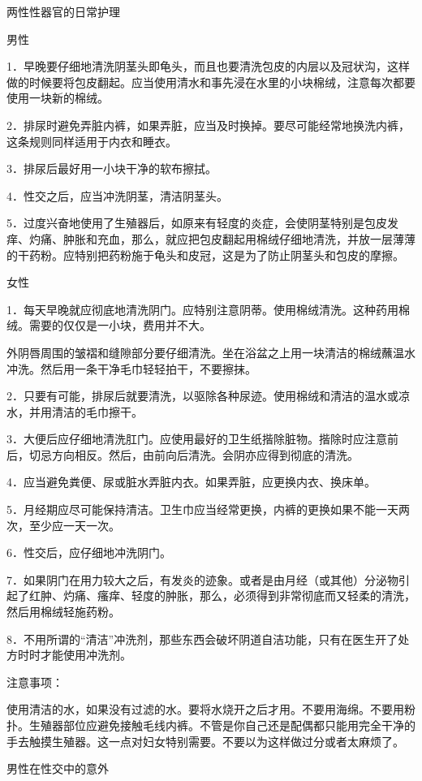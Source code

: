 \documentclass[12pt,UTF8]{ctexbook}
\begin{document}
两性性器官的日常护理


男性

1．早晚要仔细地清洗阴茎头即龟头，而且也要清洗包皮的内层以及冠状沟，这样做的时候要将包皮翻起。应当使用清水和事先浸在水里的小块棉绒，注意每次都要使用一块新的棉绒。

2．排尿时避免弄脏内裤，如果弄脏，应当及时换掉。要尽可能经常地换洗内裤，这条规则同样适用于内衣和睡衣。

3．排尿后最好用一小块干净的软布擦拭。

4．性交之后，应当冲洗阴茎，清洁阴茎头。

5．过度兴奋地使用了生殖器后，如原来有轻度的炎症，会使阴茎特别是包皮发痒、灼痛、肿胀和充血，那么，就应把包皮翻起用棉绒仔细地清洗，并放一层薄薄的干药粉。应特别把药粉施于龟头和皮冠，这是为了防止阴茎头和包皮的摩擦。

女性

1．每天早晚就应彻底地清洗阴门。应特别注意阴蒂。使用棉绒清洗。这种药用棉绒。需要的仅仅是一小块，费用并不大。

外阴唇周围的皱褶和缝隙部分要仔细清洗。坐在浴盆之上用一块清洁的棉绒蘸温水冲洗。然后用一条干净毛巾轻轻拍干，不要擦抹。

2．只要有可能，排尿后就要清洗，以驱除各种尿迹。使用棉绒和清洁的温水或凉水，并用清洁的毛巾擦干。

3．大便后应仔细地清洗肛门。应使用最好的卫生纸揩除脏物。揩除时应注意前后，切忌方向相反。然后，由前向后清洗。会阴亦应得到彻底的清洗。

4．应当避免粪便、尿或脏水弄脏内衣。如果弄脏，应更换内衣、换床单。

5．月经期应尽可能保持清洁。卫生巾应当经常更换，内裤的更换如果不能一天两次，至少应一天一次。

6．性交后，应仔细地冲洗阴门。

7．如果阴门在用力较大之后，有发炎的迹象。或者是由月经（或其他）分泌物引起了红肿、灼痛、瘙痒、轻度的肿胀，那么，必须得到非常彻底而又轻柔的清洗，然后用棉绒轻施药粉。

8．不用所谓的“清洁”冲洗剂，那些东西会破坏阴道自洁功能，只有在医生开了处方时时才能使用冲洗剂。

注意事项：

使用清洁的水，如果没有过滤的水。要将水烧开之后才用。不要用海绵。不要用粉扑。生殖器部位应避免接触毛线内裤。不管是你自己还是配偶都只能用完全干净的手去触摸生殖器。这一点对妇女特别需要。不要以为这样做过分或者太麻烦了。





男性在性交中的意外
\end{document}
